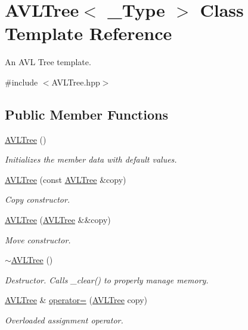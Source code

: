 \hypertarget{class_a_v_l_tree}{}\section{A\+V\+L\+Tree$<$ \+\_\+\+Type $>$ Class Template Reference}
\label{class_a_v_l_tree}


An A\+V\+L Tree template.  




{\ttfamily \#include $<$A\+V\+L\+Tree.\+hpp$>$}

\subsection*{Public Member Functions}
\begin{DoxyCompactItemize}
\item 
\hyperlink{class_a_v_l_tree_a3105fda72da80d723954e28623217784}{A\+V\+L\+Tree} ()
\begin{DoxyCompactList}\small\item\em Initializes the member data with default values. \end{DoxyCompactList}\item 
\hyperlink{class_a_v_l_tree_a837ef12a2f40b4285332dcf1cdaf0065}{A\+V\+L\+Tree} (const \hyperlink{class_a_v_l_tree}{A\+V\+L\+Tree} \&copy)
\begin{DoxyCompactList}\small\item\em Copy constructor. \end{DoxyCompactList}\item 
\hyperlink{class_a_v_l_tree_af975ce032bf12e7e952651df2430a153}{A\+V\+L\+Tree} (\hyperlink{class_a_v_l_tree}{A\+V\+L\+Tree} \&\&copy)
\begin{DoxyCompactList}\small\item\em Move constructor. \end{DoxyCompactList}\item 
\hyperlink{class_a_v_l_tree_aa679b2f120f33fda54e61ac9fe1fbfd1}{$\sim$\+A\+V\+L\+Tree} ()
\begin{DoxyCompactList}\small\item\em Destructor. Calls \+\_\+clear() to properly manage memory. \end{DoxyCompactList}\item 
\hyperlink{class_a_v_l_tree}{A\+V\+L\+Tree} \& \hyperlink{class_a_v_l_tree_ab6e878dfa1a127b4f79be2d32f075d2e}{operator=} (\hyperlink{class_a_v_l_tree}{A\+V\+L\+Tree} copy)
\begin{DoxyCompactList}\small\item\em Overloaded assignment operator. \end{DoxyCompactList}\item 

\end{DoxyCompactItemize}

